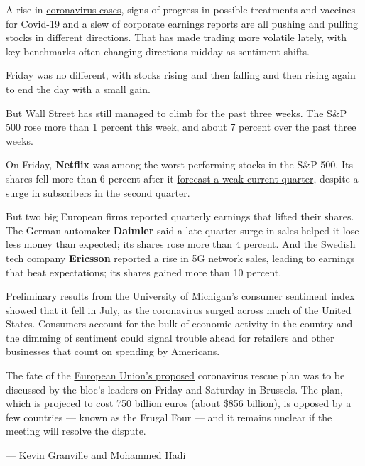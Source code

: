 A rise in
\href{https://www.nytimes.com/interactive/2020/us/coronavirus-us-cases.html}{coronavirus
cases}, signs of progress in possible treatments and vaccines for
Covid-19 and a slew of corporate earnings reports are all pushing and
pulling stocks in different directions. That has made trading more
volatile lately, with key benchmarks often changing directions midday as
sentiment shifts.

Friday was no different, with stocks rising and then falling and then
rising again to end the day with a small gain.

But Wall Street has still managed to climb for the past three weeks. The
S\&P 500 rose more than 1 percent this week, and about 7 percent over
the past three weeks.

On Friday, \textbf{Netflix} was among the worst performing stocks in the
S\&P 500. Its shares fell more than 6 percent after it
\href{https://www.nytimes.com/2020/07/16/business/netflix-subscriptions-earnings-sarandos.html}{forecast
a weak current quarter}, despite a surge in subscribers in the second
quarter.

But two big European firms reported quarterly earnings that lifted their
shares. The German automaker \textbf{Daimler} said a late-quarter surge
in sales helped it lose less money than expected; its shares rose more
than 4 percent. And the Swedish tech company \textbf{Ericsson} reported
a rise in 5G network sales, leading to earnings that beat expectations;
its shares gained more than 10 percent.

Preliminary results from the University of Michigan's consumer sentiment
index showed that it fell in July, as the coronavirus surged across much
of the United States. Consumers account for the bulk of economic
activity in the country and the dimming of sentiment could signal
trouble ahead for retailers and other businesses that count on spending
by Americans.

The fate of the
\href{https://www.nytimes.com/2020/07/16/world/europe/Merkel-EU-summit-coronavirus-rescue-recovery-plan.html}{European
Union's proposed} coronavirus rescue plan was to be discussed by the
bloc's leaders on Friday and Saturday in Brussels. The plan, which is
projeced to cost 750 billion euros (about \$856 billion), is opposed by
a few countries --- known as the Frugal Four --- and it remains unclear
if the meeting will resolve the dispute.

--- \href{https://www.nytimes.com/by/kevin-granville}{Kevin Granville}
and Mohammed Hadi

